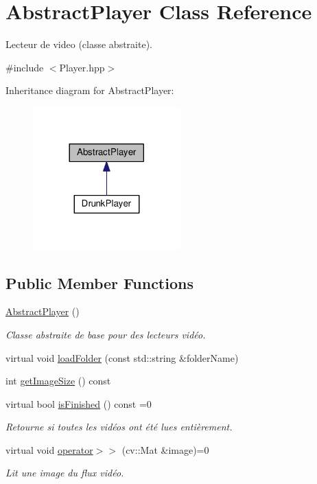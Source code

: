 \hypertarget{classAbstractPlayer}{\section{Abstract\+Player Class Reference}
\label{classAbstractPlayer}
}


Lecteur de video (classe abstraite).  




{\ttfamily \#include $<$Player.\+hpp$>$}



Inheritance diagram for Abstract\+Player\+:\nopagebreak
\begin{figure}[H]
\begin{center}
\leavevmode
\includegraphics[width=161pt]{classAbstractPlayer__inherit__graph}
\end{center}
\end{figure}
\subsection*{Public Member Functions}
\begin{DoxyCompactItemize}
\item 
\hyperlink{classAbstractPlayer_a4987602a4b3381a9c592585dde7cf33b}{Abstract\+Player} ()
\begin{DoxyCompactList}\small\item\em Classe abstraite de base pour des lecteurs vidéo. \end{DoxyCompactList}\item 
virtual void \hyperlink{classAbstractPlayer_a2091b1757bfd13116dfa4612af55473b}{load\+Folder} (const std\+::string \&folder\+Name)
\item 
int \hyperlink{classAbstractPlayer_a8bdc017fb32c90e6635ed6b7491fbe98}{get\+Image\+Size} () const 
\item 
virtual bool \hyperlink{classAbstractPlayer_a841896a599ebe6b8317905de78c44bcc}{is\+Finished} () const =0
\begin{DoxyCompactList}\small\item\em Retourne si toutes les vidéos ont été lues entièrement. \end{DoxyCompactList}\item 
virtual void \hyperlink{classAbstractPlayer_a5c9a863c96224dd297aa44c69010cd94}{operator$>$$>$} (cv\+::\+Mat \&image)=0
\begin{DoxyCompactList}\small\item\em Lit une image du flux vidéo. \end{DoxyCompactList}\end{DoxyCompactItemize}
